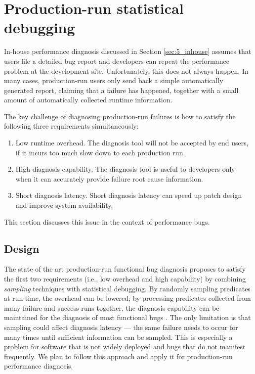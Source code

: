 \section{Production-run statistical debugging}
\label{sec:5_lbr}
In-house performance diagnosis discussed in Section \ref{sec:5_inhouse} assumes
that users file a detailed bug report and developers can repeat the 
performance problem at the development site. Unfortunately, this does not always
happen. In many cases, production-run users only send 
back a simple automatically generated report, claiming that a failure has 
happened, together with a small amount
of automatically collected runtime information. 

The key challenge of diagnosing production-run failures is how to satisfy the
following three requirements simultaneously:

\begin{enumerate}
\item Low runtime overhead. 
The diagnosis tool will not be accepted by end users, if it incurs too much
slow down to each production run.

\item High diagnosis capability. 
The diagnosis tool is useful to developers only when it can accurately 
provide failure root cause information.

\item Short diagnosis latency. 
Short diagnosis latency can speed up patch design and improve system
availability.
\end{enumerate}

This section discusses this issue
in the context of performance bugs.

\subsection{Design}
The state of the art production-run
functional bug diagnosis \citep{liblit03,liblit05,CCI,joy.asplos13} proposes
to satisfy the first two requirements (i.e., low overhead and high capability)
by combining  
\textit{sampling} techniques with
statistical debugging.
By randomly sampling predicates at run time, the overhead can be lowered;
by processing predicates collected from many failure and success runs
together, the diagnosis capability can be maintained for the diagnosis of most
functional bugs \citep{liblit03,liblit05,CCI,joy.asplos13}.
The only limitation is that sampling could affect diagnosis latency 
--- the same failure needs to occur for many times until sufficient information
can be sampled. This is especially a problem for software that is not widely
deployed and bugs that do not manifest frequently.
We plan to follow this approach and apply it for production-run performance
diagnosis.

